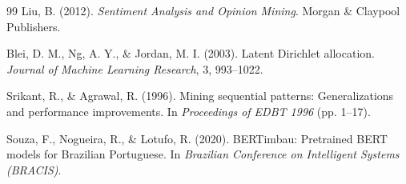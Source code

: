 \documentclass[12pt,a4paper]{article}
\begin{document}
\begin{thebibliography}{99}
 Liu, B. (2012). \textit{Sentiment Analysis and Opinion Mining}. Morgan \& Claypool Publishers.

 Blei, D. M., Ng, A. Y., \& Jordan, M. I. (2003). Latent Dirichlet allocation. \textit{Journal of Machine Learning Research}, 3, 993--1022.

 Srikant, R., \& Agrawal, R. (1996). Mining sequential patterns: Generalizations and performance improvements. In \textit{Proceedings of EDBT 1996} (pp. 1--17).

 Souza, F., Nogueira, R., \& Lotufo, R. (2020). BERTimbau: Pretrained BERT models for Brazilian Portuguese. In \textit{Brazilian Conference on Intelligent Systems (BRACIS)}.

\end{thebibliography}
\end{document}
